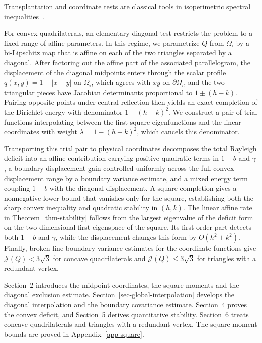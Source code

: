 \documentclass[11pt]{amsart}
\theoremstyle{remark}\newtheorem{remark}[theorem]{Remark}
\numberwithin{equation}{section}
\begin{document}
Transplantation and coordinate tests are classical tools in isoperimetric
spectral inequalities~\cite{PolyaSchiffer1954,Szego1954,Weinberger1956}.

For convex quadrilaterals, an elementary diagonal test restricts the problem to a fixed range of affine parameters. In this regime, we parametrize $Q$ from $\Omega_\square$ by a bi-Lipschitz map that is affine on each of the two triangles separated by a diagonal. After factoring out the affine part of the associated parallelogram, the displacement of the diagonal midpoints enters through the scalar profile $q(x,y)=1-|x-y|$ on $\Omega_\square$, which agrees with $xy$ on $\partial\Omega_\square$, and the two triangular pieces have Jacobian determinants proportional to $1\pm(h-k)$. Pairing opposite points under central reflection then yields an exact completion of the Dirichlet energy with denominator $1-(h-k)^2$. We construct a pair of trial functions interpolating between the first square eigenfunctions and the linear coordinates with weight $\lambda=1-(h-k)^2$, which cancels this denominator.

Transporting this trial pair to physical coordinates decomposes the total Rayleigh deficit into an affine contribution carrying positive quadratic terms in $1-b$ and $\gamma$, a boundary displacement gain controlled uniformly across the full convex displacement range by a boundary variance estimate, and a mixed energy term coupling $1-b$ with the diagonal displacement. A square completion gives a nonnegative lower bound that vanishes only for the square, establishing both the sharp convex inequality and quadratic stability in $(h,k)$. The linear affine rate in Theorem~\ref{thm-stability} follows from the largest eigenvalue of the deficit form on the two-dimensional first eigenspace of the square. Its first-order part detects both $1-b$ and $\gamma$, while the displacement changes this form by $O(h^2+k^2)$. Finally, broken-line boundary variance estimates for the coordinate functions give $\mathcal J(Q)<3\sqrt{3}$ for concave quadrilaterals and $\mathcal J(Q)\le3\sqrt{3}$ for triangles with a redundant vertex.

Section~2 introduces the midpoint coordinates, the square moments and the
diagonal exclusion estimate. Section~\ref{sec-global-interpolation}
develops the diagonal interpolation and the boundary covariance estimate.
Section~4 proves the convex deficit, and Section~5 derives quantitative
stability. Section~6 treats concave quadrilaterals and triangles with a
redundant vertex. The square moment bounds are proved in
Appendix~\ref{app-square}.
\end{document}
